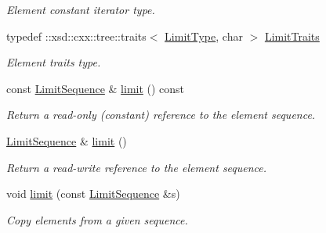 \begin{DoxyCompactItemize}
\begin{DoxyCompactList}\small\item\em Element constant iterator type. \item\end{DoxyCompactList}\item 
\hypertarget{classopenstack_1_1xml_1_1AbsoluteLimits_a5bc4b27e58fd8e8772a4ba01e15d78e8}{
typedef ::xsd::cxx::tree::traits$<$ \hyperlink{classopenstack_1_1xml_1_1AbsoluteLimit}{LimitType}, char $>$ \hyperlink{classopenstack_1_1xml_1_1AbsoluteLimits_a5bc4b27e58fd8e8772a4ba01e15d78e8}{LimitTraits}}
\label{classopenstack_1_1xml_1_1AbsoluteLimits_a5bc4b27e58fd8e8772a4ba01e15d78e8}

\begin{DoxyCompactList}\small\item\em Element traits type. \item\end{DoxyCompactList}\item 
const \hyperlink{classopenstack_1_1xml_1_1AbsoluteLimits_ab7c2c30ecf1fa25041fc712630ea5169}{LimitSequence} \& \hyperlink{classopenstack_1_1xml_1_1AbsoluteLimits_a63f1842d92896386370606d3d9d74568}{limit} () const 
\begin{DoxyCompactList}\small\item\em Return a read-\/only (constant) reference to the element sequence. \item\end{DoxyCompactList}\item 
\hyperlink{classopenstack_1_1xml_1_1AbsoluteLimits_ab7c2c30ecf1fa25041fc712630ea5169}{LimitSequence} \& \hyperlink{classopenstack_1_1xml_1_1AbsoluteLimits_a14337866fadad060837be0386533712d}{limit} ()
\begin{DoxyCompactList}\small\item\em Return a read-\/write reference to the element sequence. \item\end{DoxyCompactList}\item 
void \hyperlink{classopenstack_1_1xml_1_1AbsoluteLimits_ac3abc711d05dbe291b341872b860d1e8}{limit} (const \hyperlink{classopenstack_1_1xml_1_1AbsoluteLimits_ab7c2c30ecf1fa25041fc712630ea5169}{LimitSequence} \&s)
\begin{DoxyCompactList}\small\item\em Copy elements from a given sequence. \item\end{DoxyCompactList}\end{DoxyCompactItemize}
